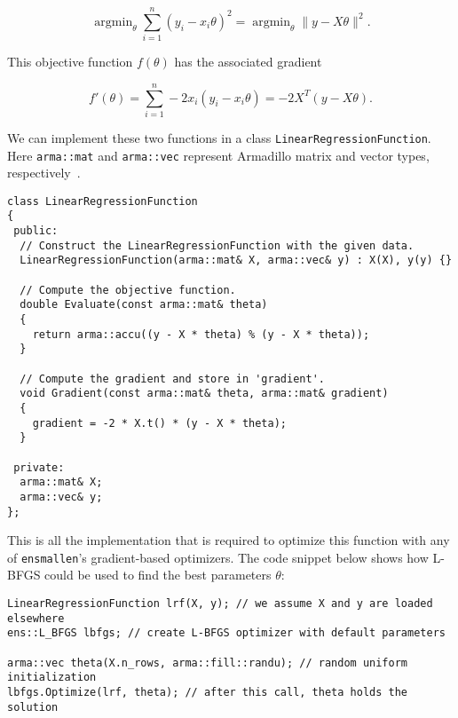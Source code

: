 \documentclass{article}
\begin{document}
\begin{equation}
\operatorname{argmin}_\theta \sum_{i = 1}^n (y_i - x_i \theta)^2 =
\operatorname{argmin}_\theta \| y - X \theta \|^2.
\end{equation}

This objective function $f(\theta)$ has the associated gradient

\begin{equation}
f'(\theta) = \sum_{i = 1}^n -2 x_i (y_i - x_i \theta) = -2 X^T (y - X \theta).
\end{equation}

We can implement these two functions in a class {\tt LinearRegressionFunction}.
Here {\tt arma::mat} and {\tt arma::vec} represent Armadillo matrix and vector
types, respectively~\cite{sanderson2016armadillo}.

\begin{verbatim}
class LinearRegressionFunction
{
 public:
  // Construct the LinearRegressionFunction with the given data.
  LinearRegressionFunction(arma::mat& X, arma::vec& y) : X(X), y(y) {}

  // Compute the objective function.
  double Evaluate(const arma::mat& theta)
  {
    return arma::accu((y - X * theta) % (y - X * theta));
  }

  // Compute the gradient and store in 'gradient'.
  void Gradient(const arma::mat& theta, arma::mat& gradient)
  {
    gradient = -2 * X.t() * (y - X * theta);
  }

 private:
  arma::mat& X;
  arma::vec& y;
};
\end{verbatim}

This is all the implementation that is required to optimize this function with
any of {\tt ensmallen}'s gradient-based optimizers.  The code snippet below
shows how L-BFGS could be used to find the best parameters $\theta$:

\begin{verbatim}
LinearRegressionFunction lrf(X, y); // we assume X and y are loaded elsewhere
ens::L_BFGS lbfgs; // create L-BFGS optimizer with default parameters

arma::vec theta(X.n_rows, arma::fill::randu); // random uniform initialization
lbfgs.Optimize(lrf, theta); // after this call, theta holds the solution
\end{verbatim}

\end{document}
